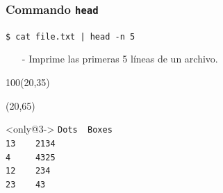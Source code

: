 \documentclass{beamer}
\begin{document}
\begin{frame}[fragile,t]
    \frametitle{Commando \texttt{head}}
    \begin{block}{\vspace*{-3ex}}
    \texttt{\$}\verb: cat file.txt | head -n 5:
    \vspace*{0.5ex}
    \end{block}
    \begin{itemize}
    \item[-] Imprime las primeras 5 líneas de un archivo.
    \end{itemize}
    \begin{textblock}{100}(20,35)
    \begin{center}
    \end{center}
    \end{textblock}
    \begin{textblock}{36}(20,65)
     \vspace{-0.5cm}
    \begin{block}<only@3->{\vspace*{-3ex}}
    \small
    \verb:Dots  Boxes:\\
    \verb:13    2134:\\
    \verb:4     4325:\\
    \verb:12    234:\\
    \verb:23    43:
    \vspace*{0.5ex}
    \end{block}
    \end{textblock}
\end{frame}
\end{document}
